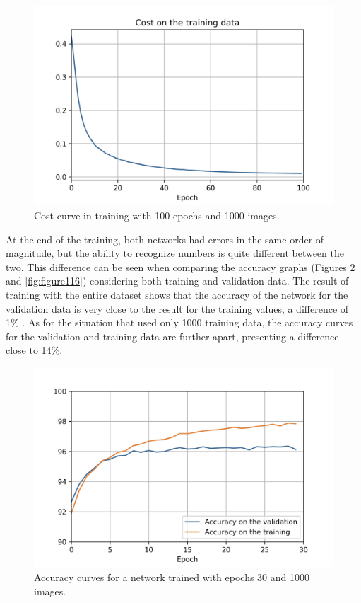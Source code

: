 \begin{figure}
    \centering
    \includegraphics[scale=0.6]{"Part 3 - Learning Systems/Supervised Learning/Deep Learning/images/figure114.jpg"}
    \caption{Cost curve in training with 100 epochs and 1000 images.}
    \label{fig:figure114}
\end{figure}

At the end of the training, both networks had errors in the same order of magnitude, but the ability to recognize numbers is quite different between the two. This difference can be seen when comparing the accuracy graphs (Figures \ref{fig:figure115} and \ref{fig:figure116}) considering both training and validation data. The result of training with the entire dataset shows that the accuracy of the network for the validation data is very close to the result for the training values, a difference of 1\% . As for the situation that used only 1000 training data, the accuracy curves for the validation and training data are further apart, presenting a difference close to 14\%.

\begin{figure}
    \centering
    \includegraphics[scale=0.6]{"Part 3 - Learning Systems/Supervised Learning/Deep Learning/images/figure115.jpg"}
    \caption{Accuracy curves for a network trained with epochs 30 and 1000 images.}
    \label{fig:figure115}
\end{figure}

